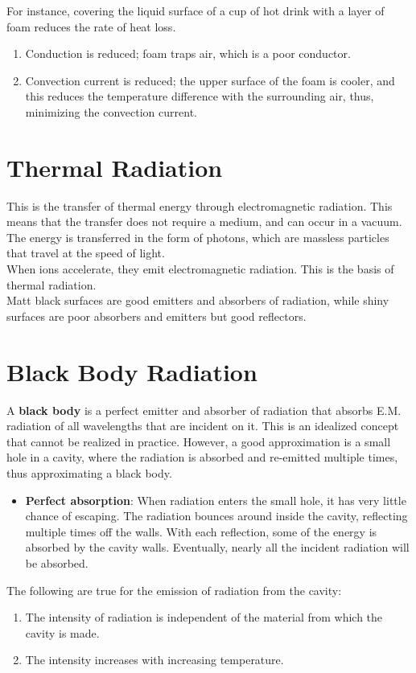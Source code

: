 \documentclass[a4paper,12pt]{article}
\let\oldsection\section
\renewcommand\section{\clearpage\oldsection}
\newcommand{\lb}{\\[8pt]}
\begin{document}
For instance, covering the liquid surface of a cup of hot drink with a layer of foam reduces the rate of heat loss.
\begin{enumerate}
  \item Conduction is reduced; foam traps air, which is a poor conductor.
  \item Convection current is reduced; the upper surface of the foam is cooler, and this reduces the temperature difference with the surrounding air, thus, minimizing the convection current.
\end{enumerate}


\section{Thermal Radiation}

This is the transfer of thermal energy through electromagnetic radiation. This means that the transfer does not require a medium, and can occur in a vacuum. The energy is transferred in the form of photons, which are massless particles that travel at the speed of light.\lb
When ions accelerate, they emit electromagnetic radiation. This is the basis of thermal radiation.\lb
Matt black surfaces are good emitters and absorbers of radiation, while shiny surfaces are poor absorbers and emitters but good reflectors.

\section{Black Body Radiation}

A \textbf{black body} is a perfect emitter and absorber of radiation that absorbs E.M. radiation of all wavelengths that are incident on it. This is an idealized concept that cannot be realized in practice. However, a good approximation is a small hole in a cavity, where the radiation is absorbed and re-emitted multiple times, thus approximating a black body.
\begin{itemize}
  \item \textbf{Perfect absorption}: When radiation enters the small hole, it has very little chance of escaping. The radiation bounces around inside the cavity, reflecting multiple times off the walls. With each reflection, some of the energy is absorbed by the cavity walls. Eventually, nearly all the incident radiation will be absorbed.
\end{itemize}
The following are true for the emission of radiation from the cavity:
\begin{enumerate}
  \item The intensity of radiation is independent of the material from which the cavity is made.
  \item The intensity increases with increasing temperature.
\end{enumerate}
\end{document}
